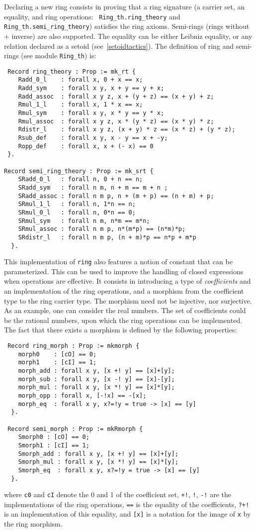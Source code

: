 
Declaring a new ring consists in proving that a ring signature (a
carrier set, an equality, and ring operations: {\tt
Ring\_th.ring\_theory} and {\tt Ring\_th.semi\_ring\_theory})
satisfies the ring axioms. Semi-rings (rings without $+$ inverse) are
also supported. The equality can be either Leibniz equality, or any
relation declared as a setoid (see~\ref{setoidtactics}). The definition
of ring and semi-rings (see module {\tt Ring\_th}) is:
\begin{verbatim}
 Record ring_theory : Prop := mk_rt {
    Radd_0_l    : forall x, 0 + x == x;
    Radd_sym    : forall x y, x + y == y + x;
    Radd_assoc  : forall x y z, x + (y + z) == (x + y) + z;
    Rmul_1_l    : forall x, 1 * x == x;
    Rmul_sym    : forall x y, x * y == y * x;
    Rmul_assoc  : forall x y z, x * (y * z) == (x * y) * z;
    Rdistr_l    : forall x y z, (x + y) * z == (x * z) + (y * z);
    Rsub_def    : forall x y, x - y == x + -y;
    Ropp_def    : forall x, x + (- x) == 0
 }.

Record semi_ring_theory : Prop := mk_srt {
    SRadd_0_l   : forall n, 0 + n == n;
    SRadd_sym   : forall n m, n + m == m + n ;
    SRadd_assoc : forall n m p, n + (m + p) == (n + m) + p;
    SRmul_1_l   : forall n, 1*n == n;
    SRmul_0_l   : forall n, 0*n == 0; 
    SRmul_sym   : forall n m, n*m == m*n;
    SRmul_assoc : forall n m p, n*(m*p) == (n*m)*p;
    SRdistr_l   : forall n m p, (n + m)*p == n*p + m*p
  }.
\end{verbatim}

This implementation of {\tt ring} also features a notion of constant
that can be parameterized. This can be used to improve the handling of
closed expressions when operations are effective. It consists in
introducing a type of \emph{coefficients} and an implementation of the
ring operations, and a morphism from the coefficient type to the ring
carrier type. The morphism need not be injective, nor surjective.  As
an example, one can consider the real numbers. The set of coefficients
could be the rational numbers, upon which the ring operations can be
implemented. The fact that there exists a morphism is defined by the
following properties:
\begin{verbatim}
 Record ring_morph : Prop := mkmorph {
    morph0    : [cO] == 0;
    morph1    : [cI] == 1;
    morph_add : forall x y, [x +! y] == [x]+[y];
    morph_sub : forall x y, [x -! y] == [x]-[y];
    morph_mul : forall x y, [x *! y] == [x]*[y];
    morph_opp : forall x, [-!x] == -[x];
    morph_eq  : forall x y, x?=!y = true -> [x] == [y] 
  }.

 Record semi_morph : Prop := mkRmorph {
    Smorph0 : [cO] == 0;
    Smorph1 : [cI] == 1;
    Smorph_add : forall x y, [x +! y] == [x]+[y];
    Smorph_mul : forall x y, [x *! y] == [x]*[y];
    Smorph_eq  : forall x y, x?=!y = true -> [x] == [y] 
  }.
\end{verbatim}
where {\tt c0} and {\tt cI} denote the 0 and 1 of the coefficient set,
{\tt +!}, {\tt *!}, {\tt -!} are the implementations of the ring
operations, {\tt ==} is the equality of the coefficients, {\tt ?+!} is
an implementation of this equality, and {\tt [x]} is a notation for
the image of {\tt x} by the ring morphism.

